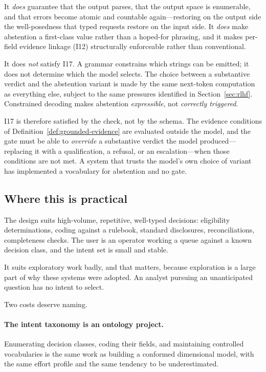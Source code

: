 It \emph{does} guarantee that the output parses, that the output space is enumerable,
and that errors become atomic and countable again---restoring on the output side the
well-posedness that typed requests restore on the input side. It \emph{does} make
abstention a first-class value rather than a hoped-for phrasing, and it makes
per-field evidence linkage (I12) structurally enforceable rather than conventional.

It does \emph{not} satisfy I17. A grammar constrains which strings can be emitted; it
does not determine which the model selects. The choice between a substantive verdict
and the abstention variant is made by the same next-token computation as everything
else, subject to the same pressures identified in Section~\ref{sec:rlhf}. Constrained decoding makes abstention \emph{expressible}, not
\emph{correctly triggered}.

I17 is therefore satisfied by the check, not by the schema. The evidence conditions of
Definition~\ref{def:grounded-evidence} are evaluated outside the model, and the gate
must be able to \emph{override} a substantive verdict the model produced---replacing it
with a qualification, a refusal, or an escalation---when those conditions are not met.
A system that trusts the model's own choice of variant has implemented a vocabulary
for abstention and no gate.

\subsection{Where this is practical}

The design suits high-volume, repetitive, well-typed decisions: eligibility
determinations, coding against a rulebook, standard disclosures, reconciliations,
completeness checks. The user is an operator working a queue against a known decision
class, and the intent set is small and stable.

It suits exploratory work badly, and that matters, because exploration is a large part
of why these systems were adopted. An analyst pursuing an unanticipated question has
no intent to select.

Two costs deserve naming.

\paragraph{The intent taxonomy is an ontology project.} Enumerating decision classes,
coding their fields, and maintaining controlled vocabularies is the same work as
building a conformed dimensional model, with the same effort profile and the same
tendency to be underestimated.

